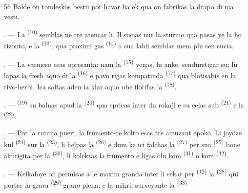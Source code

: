 \begin{VUpage}[58]{56}
\VUblancAlinea
Balde on tondeskos  bestii por havar lia\nl
{} ek qua on fabrikas la drapo di nia vesti.

\VUsaut{5.0mm}
\VUsaut{3.4mm}

. --- La  \textsuperscript{(10)} semblas ne tre atencar\nl
li. Il sucias nur la sturmo qua pasas ye la ho\cc
rizonto, e la  \textsuperscript{(13)}, qua proximi\cc
gas  \textsuperscript{(14)} a sua labii semblas mem plu sen\cc
sucia.

. --- La varmeso esas opresanta; nam la\nl
{} \textsuperscript{(15)} venas, lu anke, sendurstigar su; lu\nl
lapas la fresh aquo di la  \textsuperscript{(16)} e pavo\cc
rigas kompatinda  \textsuperscript{(17)} qua blotisabis en\nl
la rivo-herbi. Ica saltas aden la klar aquo ube\nl
florifas la  \textsuperscript{(18)}.

. ---  \textsuperscript{(19)} su balnas apud la \cc
{} \textsuperscript{(20)} qua spricas inter du rokaji e su celas\nl
sub  \textsuperscript{(21)} e la  \textsuperscript{(22)}.

\VUsaut{5.0mm}
\VUsaut{3.4mm}

. --- Por la rurana pueri, la frumento-re\cc
kolto esas tre amuzant epoko. Li joyoze kul\cc
{}\textsuperscript{(24)} sur la  \textsuperscript{(23)}, li helpas la\nl
{} \textsuperscript{(26)} e dum ke ici falchas la \cc
{} \textsuperscript{(27)} per sua  \textsuperscript{(25)} bone akutigita per\nl
la  \textsuperscript{(30)}, li kolektas la frumento e\nl
ligas olu kom  \textsuperscript{(31)} o kom  \textsuperscript{(32)}.

. --- Kelkafoye on permisas a le maxim\nl
granda inter li sekar per  \textsuperscript{(12)} la \nl
{} \textsuperscript{(28)} qui portas la grava  \textsuperscript{(29)} grano\cc
plena; e la mikri, surveyante la  \textsuperscript{(33)}
\parplein
\end{VUpage}

